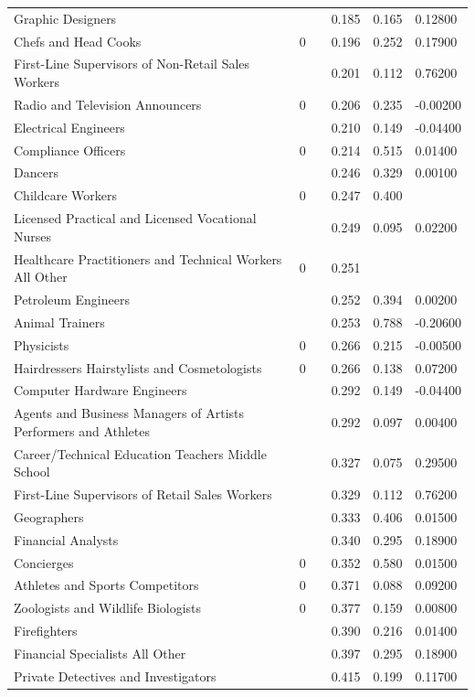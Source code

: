 \documentclass[11pt]{report}
\numberwithin{equation}{chapter}
\begin{document}
\begin{spacing}{2}
\begin{longtable}{ p{} p{} p{}  p{}  p{}  p{} }
Graphic Designers	&		&	&	0.185	&	0.165	&	0.12800	\\
Chefs and Head Cooks	&	0	&	&	0.196	&	0.252	&	0.17900	\\
First-Line Supervisors of Non-Retail Sales Workers	&		&	&	0.201	&	0.112	&	0.76200	\\
Radio and Television Announcers	&	0	&	&	0.206	&	0.235	&	-0.00200	\\
Electrical Engineers	&		&	&	0.210	&	0.149	&	-0.04400	\\
Compliance Officers	&	0	&	&	0.214	&	0.515	&	0.01400	\\
Dancers	&		&	&	0.246	&	0.329	&	0.00100	\\
Childcare Workers	&	0	&	&	0.247	&	0.400	&		\\
Licensed Practical and Licensed Vocational Nurses	&		&	&	0.249	&	0.095	&	0.02200	\\
Healthcare Practitioners and Technical Workers All Other	&	0	&	&	0.251	&		&		\\
Petroleum Engineers	&		&	&	0.252	&	0.394	&	0.00200	\\
Animal Trainers	&		&	&	0.253	&	0.788	&	-0.20600	\\
Physicists	&	0	&	&	0.266	&	0.215	&	-0.00500	\\
Hairdressers Hairstylists and Cosmetologists	&	0	&	&	0.266	&	0.138	&	0.07200	\\
Computer Hardware Engineers	&		&	&	0.292	&	0.149	&	-0.04400	\\
Agents and Business Managers of Artists Performers and Athletes	&		&	&	0.292	&	0.097	&	0.00400	\\
Career/Technical Education Teachers Middle School	&		&	&	0.327	&	0.075	&	0.29500	\\
First-Line Supervisors of Retail Sales Workers	&		&	&	0.329	&	0.112	&	0.76200	\\
Geographers	&		&	&	0.333	&	0.406	&	0.01500	\\
Financial Analysts	&		&	&	0.340	&	0.295	&	0.18900	\\
Concierges	&	0	&	&	0.352	&	0.580	&	0.01500	\\
Athletes and Sports Competitors	&	0	&	&	0.371	&	0.088	&	0.09200	\\
Zoologists and Wildlife Biologists	&	0	&	&	0.377	&	0.159	&	0.00800	\\
Firefighters	&		&	&	0.390	&	0.216	&	0.01400	\\
Financial Specialists All Other	&		&	&	0.397	&	0.295	&	0.18900	\\
Private Detectives and Investigators	&		&	&	0.415	&	0.199	&	0.11700	\\

\end{longtable}
\end{spacing}
\end{document}
